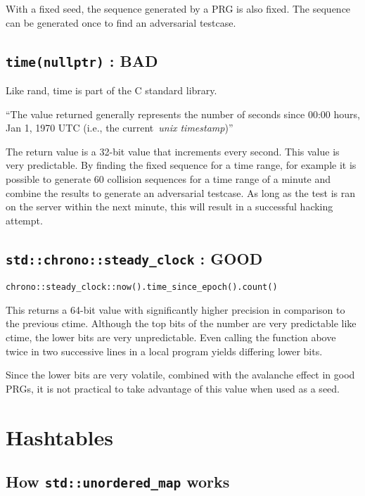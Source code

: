 \documentclass[12pt,a4paper]{article}
\begin{document}
With a fixed seed, the sequence generated by a PRG is also fixed. The
sequence can be generated once to find an adversarial testcase.

\subsection{\texorpdfstring{\texttt{time(nullptr)} :
        BAD}{time(nullptr) : BAD}}\label{timenullptr-bad}

Like rand, time is part of the C standard library.

``The value returned generally represents the number of seconds since
00:00 hours, Jan 1, 1970 UTC (i.e., the current~\emph{unix timestamp})'' \cite{ctime}

The return value is a 32-bit value that increments every second. This
value is very predictable. By finding the fixed sequence for a time
range, for example it is possible to generate 60 collision sequences for
a time range of a minute and combine the results to generate an
adversarial testcase. As long as the test is ran on the server within
the next minute, this will result in a successful hacking attempt.

\subsection{\texorpdfstring{\texttt{std::chrono::steady\_clock} :
        GOOD}{std::chrono::steady\_clock : GOOD}}\label{stdchronosteady_clock-good}

\begin{verbatim}
chrono::steady_clock::now().time_since_epoch().count()
\end{verbatim}

This returns a 64-bit value with significantly higher precision in
comparison to the previous ctime. Although the top bits of the number
are very predictable like ctime, the lower bits are very unpredictable.
Even calling the function above twice in two successive lines in a local
program yields differing lower bits.

Since the lower bits are very volatile, combined with the avalanche
effect in good PRGs, it is not practical to take advantage of this value
when used as a seed.

\section{Hashtables}\label{hashtables}

\subsection{\texorpdfstring{How \texttt{std::unordered\_map}
        works}{How std::unordered\_map works}}\label{how-stdunordered_map-works}
\end{document}

